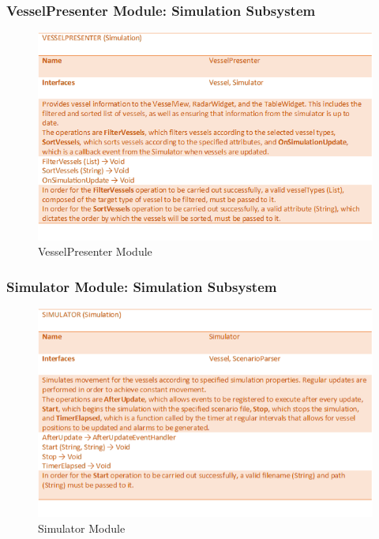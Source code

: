 \documentclass[12pt]{article}
\begin{document}
\subsubsection{VesselPresenter Module: Simulation Subsystem}
\begin{figure}[h!]
    \centering
    \includegraphics[scale=0.9]{2_2_6_vesselpresenter_(simulation)}
    \caption{VesselPresenter Module}
\end{figure}
\clearpage

\subsubsection{Simulator Module: Simulation Subsystem}
\begin{figure}[h!]
    \centering
    \includegraphics[scale=0.9]{2_2_7_simulator_(simulation)}
    \caption{Simulator Module}
\end{figure}
\clearpage
\end{document}
